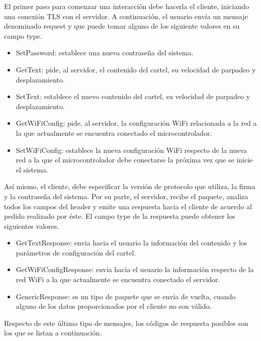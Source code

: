 El primer paso para comenzar una interacción debe hacerla el cliente, iniciando una conexión TLS con el servidor.
A continuación, el usuario envía un mensaje denominado request y que puede tomar alguno de los siguiente valores en su campo type.

\begin{itemize}
	\item SetPassword: establece una nueva contraseña del sistema.
	\item GetText: pide, al servidor, el contenido del cartel, su velocidad de parpadeo y desplazamiento.
	\item SetText: establece el nuevo contenido del cartel, su velocidad de parpadeo y desplazamiento.
	\item GetWiFiConfig: pide, al servidor, la configuración WiFi relacionada a la red a la que actualmente se encuentra conectado el microcontrolador.
	\item SetWiFiConfig: establece la nueva configuración WiFi respecto de la nueva red a la que el microcontrolador debe conectarse la próxima vez que se inicie el sistema.
\end{itemize}

Así mismo, el cliente, debe especificar la versión de protocolo que utiliza, la firma y la contraseña del sistema.
Por su parte, el servidor, recibe el paquete, analiza todos los campos del header y emite una respuesta hacia el cliente de acuerdo al pedido realizado por éste.
El campo type de la respuesta puede obtener los siguientes valores.

\begin{itemize}
	\item GetTextResponse: envia hacia el usuario la información del contenido y los parámetros de configuración del cartel.
	\item GetWiFiConfigResponse: envia hacia el usuario la información respecto de la red WiFi a la que actualmente se encuentra conectado el servidor.
	\item GenericResponse: es un tipo de paquete que se envía de vuelta, cuando alguno de los datos proporcionados por el cliente no son válido.
\end{itemize}

Respecto de este último tipo de mensajes, los códigos de respuesta posibles son los que se listan a continuación.

